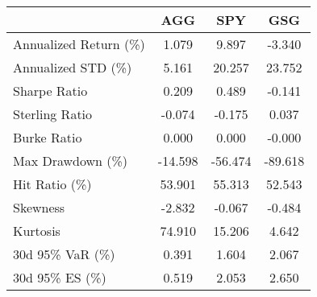 \begin{tabular}{lccc}
\toprule
{} &     AGG &     SPY &     GSG \\
\midrule
Annualized Return (\%) &   1.079 &   9.897 &  -3.340 \\
Annualized STD (\%)    &   5.161 &  20.257 &  23.752 \\
Sharpe Ratio          &   0.209 &   0.489 &  -0.141 \\
Sterling Ratio        &  -0.074 &  -0.175 &   0.037 \\
Burke Ratio           &   0.000 &   0.000 &  -0.000 \\
Max Drawdown (\%)      & -14.598 & -56.474 & -89.618 \\
Hit Ratio (\%)         &  53.901 &  55.313 &  52.543 \\
Skewness              &  -2.832 &  -0.067 &  -0.484 \\
Kurtosis              &  74.910 &  15.206 &   4.642 \\
30d 95\% VaR (\%)       &   0.391 &   1.604 &   2.067 \\
30d 95\% ES (\%)        &   0.519 &   2.053 &   2.650 \\
\bottomrule
\end{tabular}
